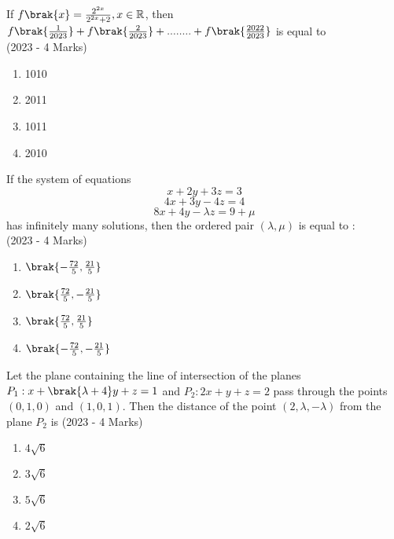     \item{
     		If $f\brak{x} = \frac{2^{2x}}{2^{2x}+2}, x\in \mathbb{R}$, then $f\brak{\frac{1}{2023}}+ f\brak{\frac{2}{2023}}+........+ f\brak{\frac{2022}{2023}}$ is equal to \\ \text{ }
            \hfill
            {(2023 - 4 Marks)}
            \begin{multicols}{4}
                \begin{enumerate}
                	\item 1010
                	\item 2011
                	\item 1011
                	\item 2010
                \end{enumerate}
            \end{multicols}
        
        }
    \item{
            If the system of equations
            \[x + 2y + 3z = 3\]
            \[4x + 3y - 4z = 4\]
            \[8x + 4y - \lambda z = 9 + \mu\]
            has infinitely many solutions, then the ordered pair
            \((\lambda, \mu)\) is equal to : \\ \text{ }
           	\hfill
                {(2023 - 4 Marks)}
            
           \begin{multicols}{4}
            	\begin{enumerate}
            		\item $\brak{-\frac{72}{5},\frac{21}{5}}$
            		\item $\brak{\frac{72}{5},-\frac{21}{5}}$
            		\item $\brak{\frac{72}{5},\frac{21}{5}}$
            		\item $\brak{-\frac{72}{5},-\frac{21}{5}}$
            	\end{enumerate}
            \end{multicols}
        
        }
 	\item{
        	Let the plane containing the line of intersection of the planes $P_{1}: x + \brak{\lambda+4}y + z = 1$ and $P_{2}: 2x + y + z = 2$ pass through the points $(0, 1, 0)$ and $(1, 0, 1)$. Then the distance of the point $(2, \lambda,- \lambda)$ from the plane $P_{2}$ is
        	\hfill
        	{(2023 - 4 Marks)}
        	
        	\begin{multicols}{4}
        		\begin{enumerate}
        			\item $4\sqrt{6}$
        			\item $3\sqrt{6}$
        			\item $5\sqrt{6}$
        			\item $2\sqrt{6}$
        		\end{enumerate}
        	\end{multicols}
        	
        }
